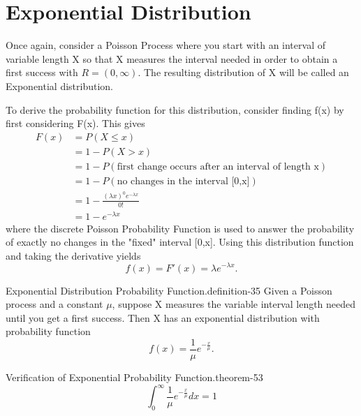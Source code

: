 \documentclass[10pt,]{book}
\numberwithin{equation}{section}
\newcommand{\gt}{>}
\begin{document}
\section[{Exponential Distribution}]{Exponential Distribution}\label{section-53}
\hypertarget{p-961}{}%
Once again, consider a Poisson Process where you start with an interval of variable length X so that X measures the interval needed in order to obtain a first success with \(R = (0,\infty)\). The resulting distribution of X will be called an Exponential distribution.%
\par
\hypertarget{p-962}{}%
To derive the probability function for this distribution, consider finding f(x) by first considering F(x). This gives%
\begin{align*}
F(x)&  = P(X \le x)\\
& = 1 - P(X \gt x)\\
& = 1 - P(\text{first change occurs after an interval of length x})\\
& = 1 - P(\text{no changes in the interval [0,x]})\\
& = 1 - \frac{(\lambda x)^0 e^{-\lambda x}}{0!}\\
& = 1 - e^{-\lambda x}
\end{align*}
where the discrete Poisson Probability Function is used to answer the probability of exactly no changes in the "fixed" interval [0,x]. Using this distribution function and taking the derivative yields%
\begin{equation*}
f(x) = F'(x) = \lambda e^{-\lambda x}.
\end{equation*}
%
\par
\hypertarget{p-963}{}%
\begin{definition}{Exponential Distribution Probability Function.}{definition-35}%
\hypertarget{p-964}{}%
Given a Poisson process and a constant \(\mu\), suppose X measures the variable interval length needed until you get a first success.  Then X has an exponential distribution with probability function%
\begin{equation*}
f(x) = \frac{1}{\mu} e^{-\frac{x}{\mu}}.
\end{equation*}
%
\end{definition}
%
\par
\hypertarget{p-965}{}%
\begin{theorem}{Verification of Exponential Probability Function.}{}{theorem-53}%
\hypertarget{p-966}{}%
%
\begin{equation*}
\int_0^{\infty} \frac{1}{\mu} e^{-\frac{x}{\mu}} dx = 1
\end{equation*}
%
\end{theorem}
\end{document}
